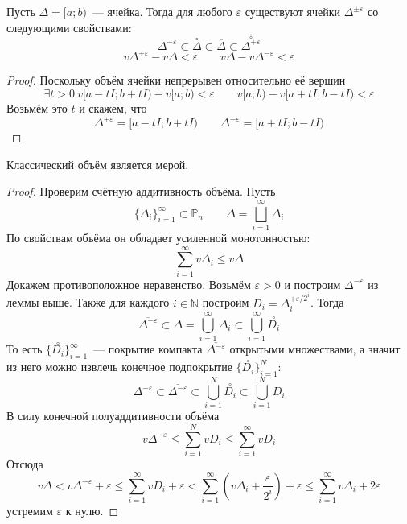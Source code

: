 \documentclass{article}
\let\eps\varepsilon
\begin{document}
    \begin{lemma}
        Пусть $\Delta=[a;b)$~--- ячейка. Тогда для любого $\eps$ существуют ячейки $\Delta^{\pm\eps}$ со следующими свойствами:
        $$
        \overline{\Delta^{-\eps}}\subset\overset{\circ}{\Delta}\subset\overline\Delta\subset\overset\circ{\Delta^{+\eps}}
        $$
        $$
        v\Delta^{+\eps}-v\Delta<\eps\qquad v\Delta-v\Delta^{-\eps}<\eps
        $$
    \end{lemma}
    \begin{proof}
        Поскольку объём ячейки непрерывен относительно её вершин
        $$
        \exists t>0~v[a-tI;b+tI)-v[a;b)<\eps\qquad v[a;b)-v[a+tI;b-tI)<\eps
        $$
        Возьмём это $t$ и скажем, что
        $$
        \Delta^{+\eps}=[a-tI;b+tI)\qquad \Delta^{-\eps}=[a+tI;b-tI)
        $$
    \end{proof}
    \begin{theorem}
        Классический объём является мерой.
    \end{theorem}
    \begin{proof}
        Проверим счётную аддитивность объёма. Пусть
        $$
        \{\Delta_i\}_{i=1}^\infty\subset\mathbb P_n\qquad\Delta=\bigsqcup\limits_{i=1}^\infty\Delta_i
        $$
        По свойствам объёма он обладает усиленной монотонностью:
        $$
        \sum\limits_{i=1}^\infty v\Delta_i\leqslant v\Delta
        $$
        Докажем противоположное неравенство. Возьмём $\eps>0$ и построим $\Delta^{-\eps}$ из леммы выше. Также для каждого $i\in\mathbb N$ построим $D_i=\Delta_i^{+\eps/2^i}$. Тогда
        $$
        \overline{\Delta^{-\eps}}\subset\Delta=\bigcup\limits_{i=1}^\infty\Delta_i\subset\bigcup\limits_{i=1}^\infty\overset\circ{D_i}
        $$
        То есть $\{\overset\circ{D_i}\}_{i=1}^\infty$~--- покрытие компакта $\overline{\Delta^{-\eps}}$ открытыми множествами, а значит из него можно извлечь конечное подпокрытие $\{\overset\circ{D_i}\}_{i=1}^N$:
        $$
        \Delta^{-\eps}\subset\overline{\Delta^{-\eps}}\subset\bigcup\limits_{i=1}^N\overset\circ{D_i}\subset\bigcup\limits_{i=1}^ND_i
        $$
        В силу конечной полуаддитивности объёма
        $$
        v\Delta^{-\eps}\leqslant\sum\limits_{i=1}^NvD_i\leqslant\sum\limits_{i=1}^\infty vD_i
        $$
        Отсюда
        $$
        v\Delta<v\Delta^{-\eps}+\eps\leqslant\sum\limits_{i=1}^\infty vD_i+\eps<\sum\limits_{i=1}^\infty\left(v\Delta_i+\frac\eps{2^i}\right)+\eps\leqslant\sum\limits_{i=1}^\infty v\Delta_i+2\eps
        $$
        устремим $\eps$ к нулю.
    \end{proof}
\end{document}
